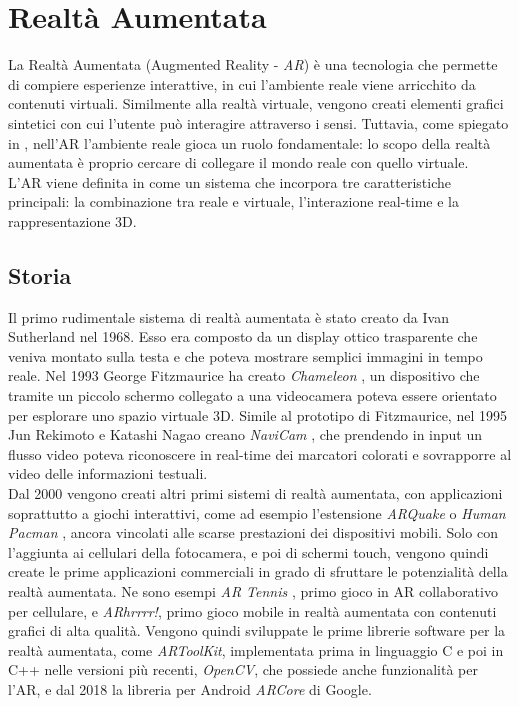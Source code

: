 \documentclass[crop=false, class=book]{standalone}
\begin{document}
	\chapter{Realtà Aumentata}
	La Realtà Aumentata (Augmented Reality - \emph{AR}) è una tecnologia che permette di compiere esperienze interattive, in cui l'ambiente reale viene arricchito da contenuti virtuali. Similmente alla realtà virtuale, vengono creati elementi grafici sintetici con cui l'utente può interagire attraverso i sensi. Tuttavia, come spiegato in \cite{bimber2005spatial}, nell'AR l'ambiente reale gioca un ruolo fondamentale: lo scopo della realtà aumentata è proprio cercare di collegare il mondo reale con quello virtuale.
	\\
	L'AR viene definita in \cite{azuma1997survey} come un sistema che incorpora tre caratteristiche principali: la combinazione tra reale e virtuale, l'interazione real-time e la rappresentazione 3D. 
	
	\section{Storia}
	Il primo rudimentale sistema di realtà aumentata è stato creato da Ivan Sutherland \cite{sutherland1968head} nel 1968. Esso era composto da un display ottico trasparente che veniva montato sulla testa e che poteva mostrare semplici immagini in tempo reale. Nel 1993 George Fitzmaurice ha creato \textit{Chameleon} \cite{fitzmaurice1993situated}, un dispositivo che tramite un piccolo schermo collegato a una videocamera poteva essere orientato per esplorare uno spazio virtuale 3D. Simile al prototipo di Fitzmaurice, nel 1995 Jun Rekimoto e Katashi Nagao creano \textit{NaviCam} \cite{rekimoto1995world}, che prendendo in input un flusso video poteva riconoscere in real-time dei marcatori colorati e sovrapporre al video delle informazioni testuali. 
	\\
	Dal 2000 vengono creati altri primi sistemi di realtà aumentata, con applicazioni soprattutto a giochi interattivi, come ad esempio l'estensione \textit{ARQuake} \cite{thomas2000arquake} o \textit{Human Pacman} \cite{cheok2003human}, ancora vincolati alle scarse prestazioni dei dispositivi mobili. Solo con l'aggiunta ai cellulari della fotocamera, e poi di schermi touch, vengono quindi create le prime applicazioni commerciali in grado di sfruttare le potenzialità della realtà aumentata. Ne sono esempi \textit{AR Tennis} \cite{henrysson2006ARtennis}, primo gioco in AR collaborativo per cellulare, e \textit{ARhrrrr!}, primo gioco mobile in realtà aumentata con contenuti grafici di alta qualità. Vengono quindi sviluppate le prime librerie software per la realtà aumentata, come \textit{ARToolKit}, implementata prima in linguaggio C e poi in C++ nelle versioni più recenti, \textit{OpenCV}, che possiede anche funzionalità per l'AR, e dal 2018 la libreria per Android \textit{ARCore} di Google.
	
\end{document}
